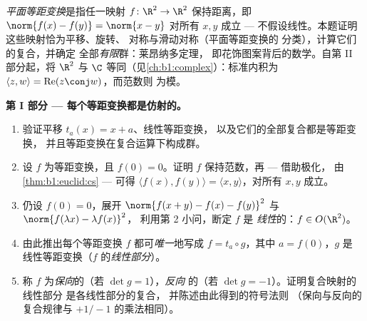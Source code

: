 \begin{problem}\label{pb:b1:euclid:1}
\emph{平面等距变换}是指任一映射 $f \colon \R^2 \to
\R^2$ 保持距离，即 $\norm{f(x) - f(y)} = \norm{x - y}$
对所有 $x, y$ 成立 --- 不假设线性。本题证明
这些映射恰为平移、旋转、
对称与滑动对称（平面等距变换的
分类），计算它们的复合，并确定
全部\emph{有限}群：莱昂纳多定理，
即花饰图案背后的数学。自第 II 部分起，将 $\R^2$ 与
$\C$ 等同（见\cref{ch:b1:complex}）：标准内积为
$\langle z, w\rangle = \operatorname{Re}(z\conj w)$，而范数则
为模。

\medskip
\noindent\textbf{第 I 部分 --- 每个等距变换都是仿射的。}
\begin{enumerate}
  \item 验证平移 $t_a(x) = x + a$、线性等距变换，
        以及它们的全部复合都是等距变换，
        并且等距变换在复合运算下构成群。
  \item 设 $f$ 为等距变换，且 $f(0) = 0$。证明 $f$
        保持范数，再 --- 借助极化，
        由\cref{thm:b1:euclid:cs} --- 可得 $\langle f(x),
        f(y)\rangle = \langle x, y\rangle$，对所有 $x, y$ 成立。
  \item 仍设 $f(0) = 0$，展开 $\norm{f(x + y) - f(x) -
        f(y)}^2$ 与 $\norm{f(\lambda x) - \lambda f(x)}^2$，
        利用第 2 小问，断定 $f$ 是
        \emph{线性}的：$f \in O(\R^2)$。
  \item 由此推出每个等距变换 $f$ 都可\emph{唯一}地写成
        $f = t_a \circ g$，其中 $a = f(0)$，$g$ 是
        线性等距变换（$f$ 的\emph{线性部分}）。
  \item 称 $f$ 为\emph{保向}的（若 $\det g = 1$），\emph{反向}
        的（若 $\det g = -1$）。证明复合映射的线性部分
        是各线性部分的复合，
        并陈述由此得到的符号法则
        （保向与反向的复合规律与 $+1/-1$ 的乘法相同）。
\end{enumerate}


\end{problem}
